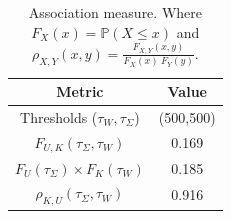 \begin{table}[H]\centering
\caption{Association measure. Where $F_X(x) =  \mathbb{P}(X \leq x)$ and $\rho_{X,Y}(x,y) = \frac{F_{X,Y}(x,y)}{F_X(x) \ F_Y(y)}$.}
\label{tab:Association measure}
\begin{tabular}{|c|c|}
\toprule
\textbf{Metric} & \textbf{Value} \\
\midrule
Thresholds ($\tau_W, \tau_\Sigma$) & (500,500) \\
$F_{U,K}(\tau_\Sigma, \tau_W)$ & 0.169 \\
$F_{U}(\tau_\Sigma) \times F_{K}(\tau_W)$ & 0.185 \\
$\rho_{K,U} (\tau_\Sigma, \tau_W)$ & 0.916 \\
\bottomrule
\end{tabular}
\end{table}
